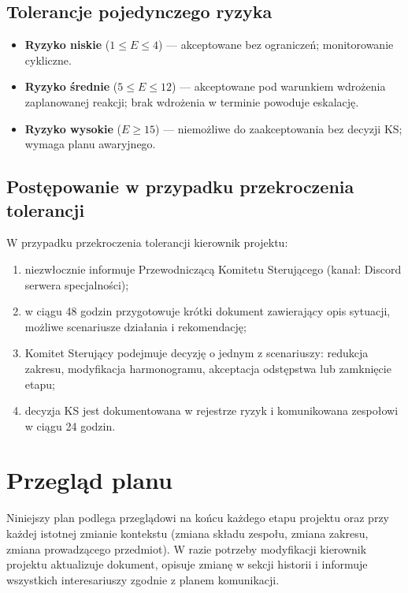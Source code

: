 \documentclass[11pt,a4paper]{article}
\begin{document}
	\subsection{Tolerancje pojedynczego ryzyka}
	\begin{itemize}[noitemsep]
		\item \textbf{Ryzyko niskie} ($1 \le E \le 4$) --- akceptowane bez ograniczeń; monitorowanie cykliczne.
		\item \textbf{Ryzyko średnie} ($5 \le E \le 12$) --- akceptowane pod warunkiem wdrożenia zaplanowanej reakcji; brak wdrożenia w terminie powoduje eskalację.
		\item \textbf{Ryzyko wysokie} ($E \ge 15$) --- niemożliwe do zaakceptowania bez decyzji KS; wymaga planu awaryjnego.
	\end{itemize}
	
	\subsection{Postępowanie w przypadku przekroczenia tolerancji}
	W przypadku przekroczenia tolerancji kierownik projektu:
	\begin{enumerate}[noitemsep]
		\item niezwłocznie informuje Przewodniczącą Komitetu Sterującego (kanał: Discord serwera specjalności);
		\item w ciągu 48 godzin przygotowuje krótki dokument zawierający opis sytuacji, możliwe scenariusze działania i rekomendację;
		\item Komitet Sterujący podejmuje decyzję o jednym z scenariuszy: redukcja zakresu, modyfikacja harmonogramu, akceptacja odstępstwa lub zamknięcie etapu;
		\item decyzja KS jest dokumentowana w rejestrze ryzyk i komunikowana zespołowi w ciągu 24 godzin.
	\end{enumerate}
	
	\section{Przegląd planu}\label{sec:przeglad}
	
	\noindent Niniejszy plan podlega przeglądowi na końcu każdego etapu projektu oraz przy każdej
	istotnej zmianie kontekstu (zmiana składu zespołu, zmiana zakresu, zmiana prowadzącego
	przedmiot). W razie potrzeby modyfikacji kierownik projektu aktualizuje dokument, opisuje
	zmianę w sekcji historii i informuje wszystkich interesariuszy zgodnie z planem komunikacji.
	
\end{document}
